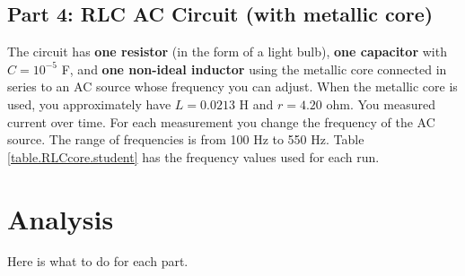 \subsection{Part 4: RLC AC Circuit (with metallic core)}
The circuit has \textbf{one resistor} (in the form of a light bulb), \textbf{one capacitor} with $C = 10^{-5}$ F, and \textbf{one non-ideal inductor} using the metallic core connected in series to an AC source whose frequency you can adjust. When the metallic core is used, you approximately have $L = 0.0213$ H and $r = 4.20$ ohm. You measured current over time. For each measurement you change the frequency of the AC source. The range of frequencies is from 100 Hz to 550 Hz. Table \ref{table.RLCcore.student} has the frequency values used for each run.
\section{Analysis}
Here is what to do for each part.
